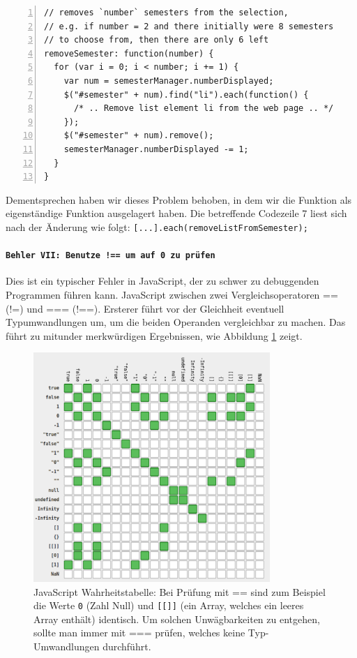 \documentclass[ngerman]{article}
\begin{document}
\begin{lstlisting}[caption=Funktion zum Löschen von Semestern,numbers=left,label={lst:error_6},frame=single]
// removes `number` semesters from the selection,
// e.g. if number = 2 and there initially were 8 semesters
// to choose from, then there are only 6 left
removeSemester: function(number) {
  for (var i = 0; i < number; i += 1) {
    var num = semesterManager.numberDisplayed;
    $("#semester" + num).find("li").each(function() {
      /* .. Remove list element li from the web page .. */
    });
    $("#semester" + num).remove();
    semesterManager.numberDisplayed -= 1;
  }
}
\end{lstlisting}

Dementsprechen haben wir dieses Problem behoben, in dem wir die Funktion als eigenständige Funktion ausgelagert haben.
Die betreffende Codezeile 7 liest sich nach der Änderung wie folgt:
\texttt{[...].each(removeListFromSemester);}

\paragraph{\texttt{Behler VII: Benutze !== um auf 0 zu prüfen}}

Dies ist ein typischer Fehler in JavaScript, der zu schwer zu debuggenden Programmen führen kann.
JavaScript zwischen zwei Vergleichsoperatoren == (!=) und === (!==).
Ersterer führt vor der Gleichheit eventuell Typumwandlungen um, um die beiden Operanden vergleichbar zu machen.
Das führt zu mitunder merkwürdigen Ergebnissen, wie Abbildung \ref{fig:javascript_truth_table} zeigt.

\begin{figure}[h!]
\centering
\includegraphics[width=0.8\textwidth]{figures/javascript_truth_table.pdf}
\caption{JavaScript Wahrheitstabelle: Bei Prüfung mit == sind zum Beispiel die Werte \texttt{0} (Zahl Null) und \texttt{[[]]} (ein Array, welches ein leeres Array enthält) identisch. Um solchen Unwägbarkeiten zu entgehen, sollte man immer mit === prüfen, welches keine Typ-Umwandlungen durchführt.}
\label{fig:javascript_truth_table}
\end{figure}
\end{document}
